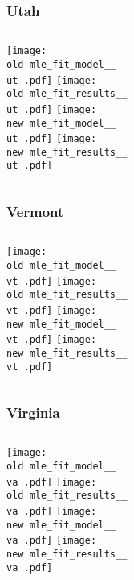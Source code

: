 \documentclass{beamer}
\newcommand{\old}{current_two_stage_output/pyseir/state_summaries/reports/}
\newcommand{\new}{new_shortest_t_delta/pyseir/state_summaries/reports/}
\newcommand{\ut}{Utah__49}
\newcommand{\vt}{Vermont__50}
\newcommand{\va}{Virginia__51}
\begin{document}
\begin{frame}
\frametitle{Utah}
    \begin{columns}[t]
       \texttt{[image: \\old mle\_fit\_model\_\_\\ut .pdf]}
       \texttt{[image: \\old mle\_fit\_results\_\_\\ut .pdf]}   
       \texttt{[image: \\new mle\_fit\_model\_\_\\ut .pdf]}
       \texttt{[image: \\new mle\_fit\_results\_\_\\ut .pdf]}   
\end{columns}
\end{frame}

\begin{frame}
\frametitle{Vermont}
    \begin{columns}[t]
       \texttt{[image: \\old mle\_fit\_model\_\_\\vt .pdf]}
       \texttt{[image: \\old mle\_fit\_results\_\_\\vt .pdf]}   
       \texttt{[image: \\new mle\_fit\_model\_\_\\vt .pdf]}
       \texttt{[image: \\new mle\_fit\_results\_\_\\vt .pdf]}   
\end{columns}
\end{frame}

\begin{frame}
\frametitle{Virginia}
    \begin{columns}[t]
       \texttt{[image: \\old mle\_fit\_model\_\_\\va .pdf]}
       \texttt{[image: \\old mle\_fit\_results\_\_\\va .pdf]}   
       \texttt{[image: \\new mle\_fit\_model\_\_\\va .pdf]}
       \texttt{[image: \\new mle\_fit\_results\_\_\\va .pdf]}   
\end{columns}
\end{frame}
\end{document}
